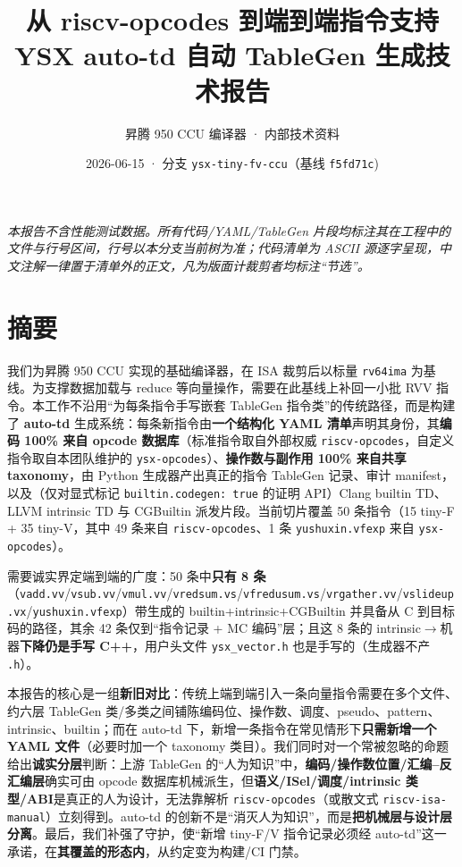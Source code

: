\documentclass[11pt,UTF8,fontset=none]{ctexart}
\title{\bfseries 从 riscv-opcodes 到端到端指令支持\\[2pt]
\large YSX auto-td 自动 TableGen 生成技术报告}
\author{昇腾 950 CCU 编译器 · 内部技术资料}
\date{2026-06-15 · 分支 \texttt{ysx-tiny-fv-ccu}（基线 \texttt{f5fd71c})}
\begin{document}
\maketitle

\noindent\small\textit{本报告不含性能测试数据。所有代码/YAML/TableGen 片段均标注其在工程中的文件与行号区间，行号以本分支当前树为准；代码清单为 ASCII 源逐字呈现，中文注解一律置于清单外的正文，凡为版面计裁剪者均标注“节选”。}\normalsize

\section*{摘要}
我们为昇腾 950 CCU 实现的基础编译器，在 ISA 裁剪后以标量 \texttt{rv64ima} 为基线。为支撑数据加载与 reduce 等向量操作，需要在此基线上补回一小批 RVV 指令。本工作不沿用“为每条指令手写嵌套 TableGen 指令类”的传统路径，而是构建了 \textbf{auto-td} 生成系统：每条新指令由\textbf{一个结构化 YAML 清单}声明其身份，其\textbf{编码 100\% 来自 opcode 数据库}（标准指令取自外部权威 \texttt{riscv-opcodes}，自定义指令取自本团队维护的 \texttt{ysx-opcodes}）、\textbf{操作数与副作用 100\% 来自共享 taxonomy}，由 Python 生成器产出真正的指令 TableGen 记录、审计 manifest，以及（仅对显式标记 \texttt{builtin.codegen:\ true} 的证明 API）Clang builtin TD、LLVM intrinsic TD 与 CGBuiltin 派发片段。当前切片覆盖 50 条指令（15 tiny-F + 35 tiny-V，其中 49 条来自 \texttt{riscv-opcodes}、1 条 \texttt{yushuxin.vfexp} 来自 \texttt{ysx-opcodes}）。

需要诚实界定端到端的广度：50 条中\textbf{只有 8 条}（\texttt{vadd.vv}/\texttt{vsub.vv}/\texttt{vmul.vv}/\texttt{vredsum.vs}/\texttt{vfredusum.vs}/\texttt{vrgather.vv}/\texttt{vslideup.vx}/\texttt{yushuxin.vfexp}）带生成的 builtin+intrinsic+CGBuiltin 并具备从 C 到目标码的路径，其余 42 条仅到“指令记录 + MC 编码”层；且这 8 条的 intrinsic$\to$机器\textbf{下降仍是手写 C++}，用户头文件 \texttt{ysx\_vector.h} 也是手写的（生成器不产 \texttt{.h}）。

本报告的核心是一组\textbf{新旧对比}：传统上端到端引入一条向量指令需要在多个文件、约六层 TableGen 类/多类之间铺陈编码位、操作数、调度、pseudo、pattern、intrinsic、builtin；而在 auto-td 下，新增一条指令在常见情形下\textbf{只需新增一个 YAML 文件}（必要时加一个 taxonomy 类目）。我们同时对一个常被忽略的命题给出\textbf{诚实分层}判断：上游 TableGen 的“人为知识”中，\textbf{编码/操作数位置/汇编–反汇编层}确实可由 opcode 数据库机械派生，但\textbf{语义/ISel/调度/intrinsic 类型/ABI}是真正的人为设计，无法靠解析 \texttt{riscv-opcodes}（或散文式 \texttt{riscv-isa-manual}）立刻得到。auto-td 的创新不是“消灭人为知识”，而是\textbf{把机械层与设计层分离}。最后，我们补强了守护，使“新增 tiny-F/V 指令记录必须经 auto-td”这一承诺，在\textbf{其覆盖的形态内}，从约定变为构建/CI 门禁。
\end{document}
